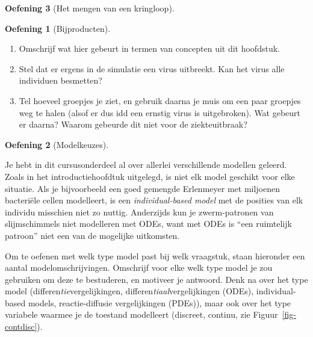 \documentclass[
  a4paper,
]{scrbook}
\providecommand{\tightlist}{%
  \setlength{\itemsep}{0pt}\setlength{\parskip}{0pt}}\usepackage{longtable,booktabs,array}
\theoremstyle{definition}
\newtheorem{exercise}{Oefening}[chapter]
\theoremstyle{remark}
\begin{document}
\begin{exercise}[Het mengen van een
kringloop]
\begin{exercise}[Bijproducten]
\begin{enumerate}
\def\labelenumi{\alph{enumi}.}
\tightlist
\item
  Omschrijf wat hier gebeurt in termen van concepten uit dit hoofdstuk.
\item
  Stel dat er ergens in de simulatie een virus uitbreekt. Kan het virus
  alle individuen besmetten?
\item
  Tel hoeveel groepjes je ziet, en gebruik daarna je muis om een paar
  groepjes weg te halen (alsof er dus idd een ernstig virus is
  uitgebroken). Wat gebeurt er daarna? Waarom gebeurde dit niet voor de
  ziekteuitbraak?
\end{enumerate}

\end{exercise}

\begin{exercise}[Modelkeuzes]\protect\hypertarget{exr-modelkeuzes}{}\label{exr-modelkeuzes}

Je hebt in dit cursusonderdeel al over allerlei verschillende modellen
geleerd. Zoals in het introductiehoofdtuk uitgelegd, is niet elk model
geschikt voor elke situatie. Als je bijvoorbeeld een goed gemengde
Erlenmeyer met miljoenen bacteriële cellen modelleert, is een
\emph{individual-based model} met de posities van elk individu misschien
niet zo nuttig. Anderzijds kun je zwerm-patronen van slijmschimmels niet
modelleren met ODEs, want met ODEs is ``een ruimtelijk patroon'' niet
een van de mogelijke uitkomsten.

Om te oefenen met welk type model past bij welk vraagstuk, staan
hieronder een aantal modelomschrijvingen. Omschrijf voor elke welk type
model je zou gebruiken om deze te bestuderen, en motiveer je antwoord.
Denk na over het type model (differen\emph{tie}vergelijkingen,
differen\emph{tiaal}vergelijkingen (ODEs), individual-based models,
reactie-diffusie vergelijkingen (PDEs)), maar ook over het type
variabele waarmee je de toestand modelleert (discreet, continu, zie
Figuur~\ref{fig-contdisc}).


\end{exercise}
\end{exercise}
\end{document}
